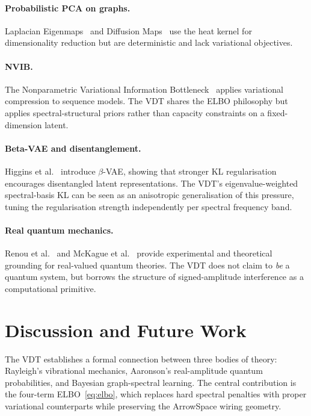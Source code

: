 \documentclass[11pt,a4paper]{article}
\begin{document}
\paragraph{Probabilistic PCA on graphs.}
Laplacian Eigenmaps~\cite{belkin2003} and Diffusion Maps~\cite{coifman2006}
use the heat kernel for dimensionality reduction but are deterministic and
lack variational objectives.

\paragraph{NVIB.}
The Nonparametric Variational Information Bottleneck~\cite{nvib2022} applies
variational compression to sequence models.  The VDT shares the ELBO
philosophy but applies spectral-structural priors rather than capacity
constraints on a fixed-dimension latent.

\paragraph{Beta-VAE and disentanglement.}
Higgins et al.~\cite{higgins2017} introduce $\beta$-VAE, showing that
stronger KL regularisation encourages disentangled latent representations.
The VDT's eigenvalue-weighted spectral-basis KL can be seen as an
anisotropic generalisation of this pressure, tuning the regularisation
strength independently per spectral frequency band.

\paragraph{Real quantum mechanics.}
Renou et al.~\cite{renou2021} and McKague et al.~\cite{mckague2009} provide
experimental and theoretical grounding for real-valued quantum theories.
The VDT does not claim to \emph{be} a quantum system, but borrows the
structure of signed-amplitude interference as a computational primitive.

\section{Discussion and Future Work}
\label{sec:conclusion}

The VDT establishes a formal connection between three bodies of theory:
Rayleigh's vibrational mechanics, Aaronson's real-amplitude quantum
probabilities, and Bayesian graph-spectral learning.  The central
contribution is the four-term ELBO~\eqref{eq:elbo}, which replaces hard
spectral penalties with proper variational counterparts while preserving the
ArrowSpace wiring geometry.
\end{document}
